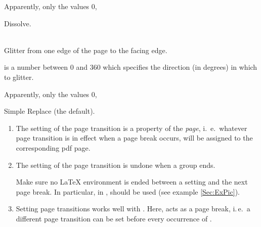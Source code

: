 \documentclass[12pt]{scrartcl}
\let\newslide=\relax
\begin{document}
\begin{description}
{      Apparently, only the values $0$, 
      }%
    \pause

  \item[{\present[h]{\macroname{pageTransitionDissolve}}}]
    Dissolve. \pageTransitionDissolve

    \newslide

  \item[{\present[h]{\commandapp{pageTransitionGlitter}{\carg{angle}}}}]
    \mbox{}\\
    Glitter from one edge of the page to the facing edge.

    \stepwise
    {%
       is a number between $0$ and $360$ which specifies the direction (in degrees) in which to glitter.

      Apparently, only the values $0$,
      }%
    \pause

  \item[{\present[h]{\macroname{pageTransitionReplace}}}]
    Simple Replace (the default).
  \end{description}

  \pageTransitionReplace

  \newslide

  \begin{enumerate}
  \item The setting of the page transition is a property of the \emph{page}, i.~e.\ whatever page transition is in
    effect when a page break occurs, will be assigned to the corresponding pdf page.

  \item The setting of the page transition is undone when a group ends.

    Make sure no \LaTeX{} environment is ended between a  setting and the next page break. In
    particular, in ,  should be used (see example \ref{Sec:ExPic}).

  \newslide

  \item Setting page transitions works well with . Here,  acts as a page break,
    i.\,e.\ a different page transition can be set before every occurrence of .
  \end{enumerate}
\end{document}
